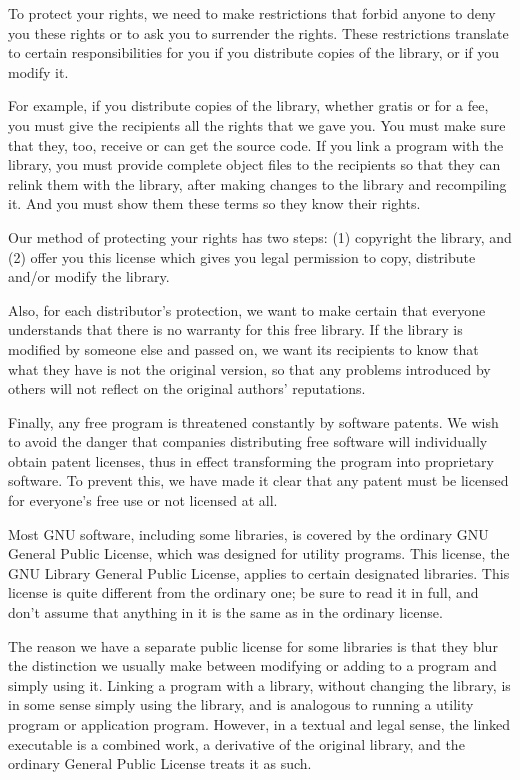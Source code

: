 \documentclass[a4paper,11pt]{report}
\begin{document}
To protect your rights, we need to make restrictions that forbid
anyone to deny you these rights or to ask you to surrender the rights.
These restrictions translate to certain responsibilities for you if
you distribute copies of the library, or if you modify it.

For example, if you distribute copies of the library, whether gratis
or for a fee, you must give the recipients all the rights that we gave
you. You must make sure that they, too, receive or can get the source
code. If you link a program with the library, you must provide
complete object files to the recipients so that they can relink them
with the library, after making changes to the library and recompiling
it. And you must show them these terms so they know their rights.

Our method of protecting your rights has two steps: (1) copyright
the library, and (2) offer you this license which gives you legal
permission to copy, distribute and/or modify the library.

Also, for each distributor's protection, we want to make certain
that everyone understands that there is no warranty for this free
library. If the library is modified by someone else and passed on, we
want its recipients to know that what they have is not the original
version, so that any problems introduced by others will not reflect on
the original authors' reputations.

Finally, any free program is threatened constantly by software
patents. We wish to avoid the danger that companies distributing free
software will individually obtain patent licenses, thus in effect
transforming the program into proprietary software. To prevent this,
we have made it clear that any patent must be licensed for everyone's
free use or not licensed at all.

Most GNU software, including some libraries, is covered by the ordinary
GNU General Public License, which was designed for utility programs. This
license, the GNU Library General Public License, applies to certain
designated libraries. This license is quite different from the ordinary
one; be sure to read it in full, and don't assume that anything in it is
the same as in the ordinary license.

The reason we have a separate public license for some libraries is that
they blur the distinction we usually make between modifying or adding to a
program and simply using it. Linking a program with a library, without
changing the library, is in some sense simply using the library, and is
analogous to running a utility program or application program. However, in
a textual and legal sense, the linked executable is a combined work, a
derivative of the original library, and the ordinary General Public License
treats it as such.
\end{document}
